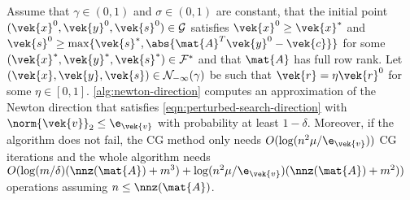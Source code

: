 \begin{theorem}\label{thm:approximate-newton-convergence}
  Assume that \(\gamma \in (0, 1)\) and \(\sigma \in (0, 1)\) are constant, that the initial point \((\vek{x}^0, \vek{y}^0, \vek{s}^0) \in \mathcal{G}\) satisfies \(\vek{x}^0 \geq \vek{x}^*\) and \(\vek{s}^0 \geq \max \{\vek{s}^*, \abs{\mat{A}^T \vek{y}^0 - \vek{c}}\}\) for some \((\vek{x}^*, \vek{y}^*, \vek{s}^*) \in \mathcal{F}^*\) and that \(\mat{A}\) has full row rank.
  Let \((\vek{x}, \vek{y}, \vek{s}) \in \mathcal{N}_{-\infty}(\gamma)\) be such that \(\vek{r} = \eta \vek{r}^0\) for some \(\eta \in [0, 1]\).
  \cref{alg:newton-direction} computes an approximation of the Newton direction that satisfies \cref{eqn:perturbed-search-direction} with \(\norm{\vek{v}}_2 \leq \e_{\vek{v}}\) with probability at least \(1 - \delta\).
  Moreover, if the algorithm does not fail, the CG method only needs \(O(\log(n^2 \mu / \e_{\vek{v}}))\) CG iterations and the whole algorithm needs \(O(\log(m/\delta) (\nnz(\mat{A}) + m^3) + \log(n^2 \mu / \e_{\vek{v}})(\nnz(\mat{A}) + m^2))\) operations assuming \(n \leq \nnz(\mat{A})\).
\end{theorem}